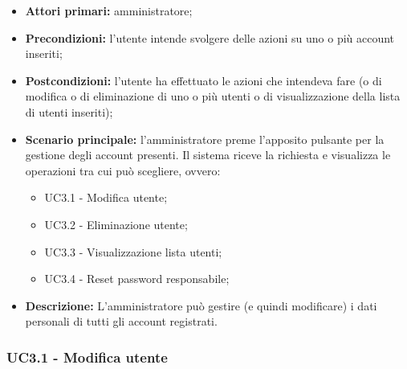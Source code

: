 \begin{itemize}
	\item 	\textbf{Attori primari:} amministratore;
	\item 	\textbf{Precondizioni:} l'utente intende svolgere delle azioni su uno o più account inseriti;
	\item 	\textbf{Postcondizioni:} l'utente ha effettuato le azioni che intendeva fare (o di modifica o di eliminazione di uno o più utenti o di visualizzazione della lista di utenti inseriti);
	\item 	\textbf{Scenario principale:} 
	l'amministratore preme l'apposito pulsante per la gestione degli account presenti. Il sistema riceve la richiesta e visualizza le operazioni tra cui può scegliere, ovvero:
	\begin{itemize}
		\item UC3.1 - Modifica utente;
		\item UC3.2 - Eliminazione utente;
		\item UC3.3 - Visualizzazione lista utenti;
		\item UC3.4 - Reset password responsabile;
	\end{itemize}
	\item 	\textbf{Descrizione:} L'amministratore può gestire (e quindi modificare) i dati personali di tutti gli account registrati.
\end{itemize}

\subsubsection{UC3.1 - Modifica utente}

